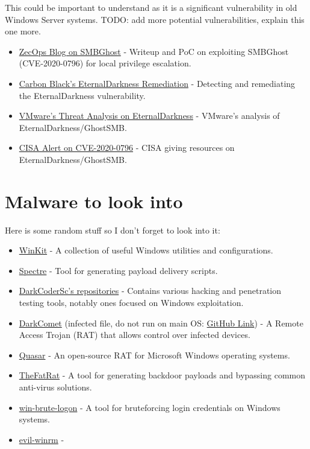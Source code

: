 \documentclass{article}
\begin{document}
This could be important to understand as it is a significant vulnerability in old Windows Server systems.
TODO: add more potential vulnerabilities, explain this one more.

\begin{itemize}
    \item \href{https://blog.zecops.com/research/exploiting-smbghost-cve-2020-0796-for-a-local-privilege-escalation-writeup-and-poc/}{ZecOps Blog on SMBGhost} - Writeup and PoC on exploiting SMBGhost (CVE-2020-0796) for local privilege escalation.
    \item \href{https://github.com/carbonblack/tau-tools/tree/master/remediation/EternalDarkness}{Carbon Black's EternalDarkness Remediation} - Detecting and remediating the EternalDarkness vulnerability.
    \item \href{https://blogs.vmware.com/security/2020/03/threat-analysis-cve-2020-0796-eternaldarkness-ghostsmb.html}{VMware's Threat Analysis on EternalDarkness} - VMware's analysis of EternalDarkness/GhostSMB.
    \item \href{https://www.cisa.gov/news-events/alerts/2020/06/05/unpatched-microsoft-systems-vulnerable-cve-2020-0796}{CISA Alert on CVE-2020-0796} - CISA giving resources on EternalDarkness/GhostSMB.    
\end{itemize}

\section{Malware to look into}
Here is some random stuff so I don't forget to look into it:
\begin{itemize}
    \item \href{https://github.com/0x44F/WinKit}{WinKit} - A collection of useful Windows utilities and configurations.
    \item \href{https://github.com/D4stiny/spectre}{Spectre} - Tool for generating payload delivery scripts.
    \item \href{https://github.com/DarkCoderSc?tab=repositories}{DarkCoderSc's repositories} - Contains various hacking and penetration testing tools, notably ones focused on Windows exploitation.
    \item \href{https://en.wikipedia.org/wiki/DarkComet}{DarkComet} (infected file, do not run on main OS: \href{https://github.com/zxo2004/DarkComet-RAT-5.3.1}{GitHub Link}) - A Remote Access Trojan (RAT) that allows control over infected devices.
    \item \href{https://github.com/quasar/Quasar}{Quasar} - An open-source RAT for Microsoft Windows operating systems.
    \item \href{https://github.com/screetsec/TheFatRat}{TheFatRat} - A tool for generating backdoor payloads and bypassing common anti-virus solutions.
    \item \href{https://github.com/DarkCoderSc/win-brute-logon}{win-brute-logon} - A tool for bruteforcing login credentials on Windows systems.
    \item \href{https://github.com/Hackplayers/evil-winrm}{evil-winrm} - 
\end{itemize}
\end{document}
